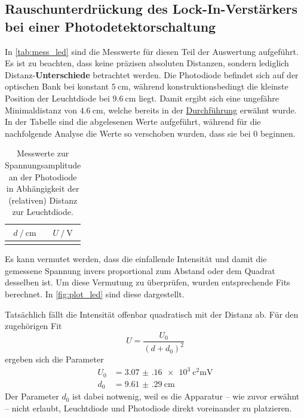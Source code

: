\clearpage
\subsection{Rauschunterdrückung des Lock-In-Verstärkers bei einer Photodetektorschaltung}

In \autoref{tab:mess_led} sind die Messwerte für diesen Teil der Auswertung aufgeführt.
Es ist zu beachten, dass keine präzisen absoluten Distanzen,
sondern lediglich Distanz-\textbf{Unterschiede} betrachtet werden.
Die Photodiode befindet sich auf der optischen Bank bei konstant $\SI{5}{\centi\meter}$,
während konstruktionsbedingt die kleinste Position der Leuchtdiode bei $\SI{9.6}{\centi\meter}$ liegt.
Damit ergibt sich eine ungefähre Minimaldistanz von $\SI{4.6}{\centi\meter}$,
welche bereits in der \hyperref[sec:durchfuehrung:led]{Durchführung} erwähnt wurde.
In der Tabelle sind die abgelesenen Werte aufgeführt,
während für die nachfolgende Analyse die Werte so verschoben wurden,
dass sie bei 0 beginnen.

\begin{table}[H]
  \centering
  \caption{Messwerte zur Spannungsamplitude an der Photodiode in Abhängigkeit der (relativen) Distanz zur Leuchtdiode.}
  \label{tab:mess_led}
  \begin{tabular}{S[table-format=2.1] S[table-format=2.2]}
    \toprule
    {$d \mathbin{/} \si{\centi\meter}$} &
    {$U \mathbin{/} \si{\volt}$} \\
    \midrule
    \bottomrule
  \end{tabular}
\end{table}

Es kann vermutet werden,
dass die einfallende Intensität und damit die gemessene Spannung
invers proportional zum Abstand oder dem Quadrat desselben ist.
Um diese Vermutung zu überprüfen,
wurden entsprechende Fits berechnet.
In \autoref{fig:plot_led} sind diese dargestellt.

Tatsächlich fällt die Intensität offenbar quadratisch mit der Distanz ab.
Für den zugehörigen Fit
\[ U = \frac{U_0}{(d + d_0)^2} \]
ergeben sich die Parameter
\begin{align*}
  U_0 &= \SI{3.07(16)e3}{\square\centi\meter\volt} \\
  d_0 &= \SI{9.61(29)}{\centi\meter}
\end{align*}
Der Parameter $d_0$ ist dabei notwenig,
weil es die Apparatur – wie zuvor erwähnt – nicht erlaubt,
Leuchtdiode und Photodiode direkt voreinander zu platzieren.

